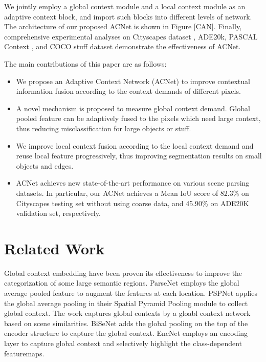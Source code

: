 \documentclass[10pt,twocolumn,letterpaper]{article}
\begin{document}
We jointly employ a global context module and a local context module as an adaptive context block, and import such blocks into different levels of network.  The architecture of our proposed ACNet is shown in Figure \ref{CAN}.  Finally, comprehensive experimental analyses on Cityscapes dataset \cite{cityscapes}, ADE20k\cite{zhou2017scene}, PASCAL Context \cite{pcontext}, and COCO stuff\cite{caesar2018coco} dataset demonstrate the effectiveness of ACNet.

The main contributions of this paper are as follows:

\begin{itemize}
   \item We propose an Adaptive Context Network (ACNet) to improve contextual information fusion according to the context demands of different pixels.

   \item A novel mechanism  is proposed to measure  global context demand. Global pooled feature can be  adaptively fused to the pixels which need large context, thus reducing misclassification for large objects or stuff. 

   \item We improve  local context fusion according to the local context demand and reuse local feature progressively, thus improving segmentation results on small objects and edges. 

   \item ACNet achieves new state-of-the-art performance on various scene parsing datasets. In particular, our ACNet achieves a Mean IoU score of 82.3\% on Cityscapes testing set without using coarse data, and 45.90\% on ADE20K validation set, respectively.

\end{itemize}


\section{Related Work}
 Global context embedding have been proven its effectiveness to improve the categorization of some large semantic regions. ParseNet \cite{parsenet} employs  the global average pooled feature to augment the features at each location.  
PSPNet \cite{pspnet} applies the global average pooling in their Spatial Pyramid Pooling module to collect global context.  The work \cite{hung2017scene} captures  global contexts by a gloabl context network based on scene similarities.
 BiSeNet  \cite{yu2018bisenet} adds the global pooling on the top of the encoder structure to capture the global context. EncNet \cite{encnet} employs an encoding layer to capture global context and selectively highlight the class-dependent featuremaps.
\end{document}

